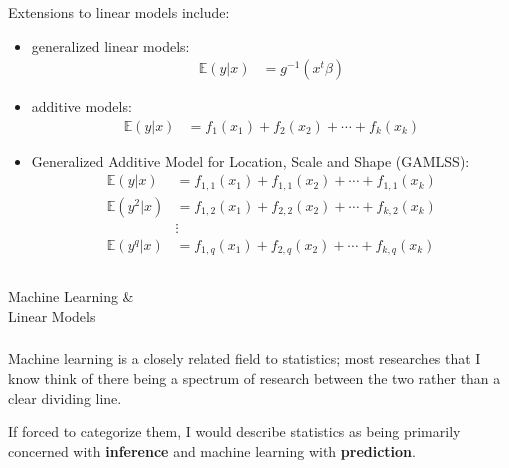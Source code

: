 \begin{frame}[fragile] \frametitle{}

Extensions to linear models include: \pause
\begin{itemize} \setlength\itemsep{0em}
\item generalized linear models:
\begin{align*}
\mathbb{E} (y | x) &= g^{-1}(x^t \beta)
\end{align*} \pause
\item additive models:
\begin{align*}
\mathbb{E} (y | x) &= f_1(x_1) + f_2(x_2) + \cdots + f_k(x_k)
\end{align*} \pause
\item Generalized Additive Model for Location, Scale and Shape (GAMLSS):
\begin{align*}
\mathbb{E} (y | x) &= f_{1,1}(x_1) + f_{1,1}(x_2) + \cdots + f_{1,1}(x_k) \\
\mathbb{E} (y^2 | x) &= f_{1,2}(x_1) + f_{2,2}(x_2) + \cdots + f_{k,2}(x_k) \\
&\vdots \\
\mathbb{E} (y^q | x) &= f_{1,q}(x_1) + f_{2,q}(x_2) + \cdots + f_{k,q}(x_k) \\
\end{align*}
\end{itemize}

\end{frame}

\begin{frame}[fragile] \frametitle{}

\begin{flushright}
{\color{yaleblue}\sc\fontsize{1cm}{1cm}\selectfont Machine Learning \& \\\medskip Linear Models}
\end{flushright}

\end{frame}

\begin{frame}[fragile] \frametitle{}

Machine learning is a closely related field to statistics; most
researches that I know think of there being a spectrum of research
between the two rather than a clear dividing line. \pause

If forced to categorize them, I would describe statistics as
being primarily concerned with {\bf inference} and machine learning
with {\bf prediction}.

\end{frame}

